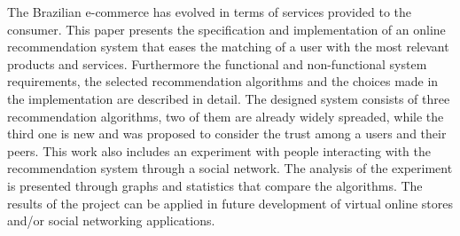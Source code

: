 The Brazilian e-commerce has evolved in terms of services provided to the consumer. This paper presents the specification and implementation of an online recommendation system that eases the matching of a user with the most relevant products and services. Furthermore the functional and non-functional system requirements, the selected recommendation algorithms and the choices made in the implementation are described in detail.
The designed system consists of three recommendation algorithms, two of them are already widely spreaded, while the third one is new and was proposed to consider the trust among a users and their peers.
This work also includes an experiment with people interacting with the recommendation system through a social network. The analysis of the experiment is presented through graphs and statistics that compare the algorithms.
The results of the project can be applied in future development of virtual online stores and/or social networking applications.